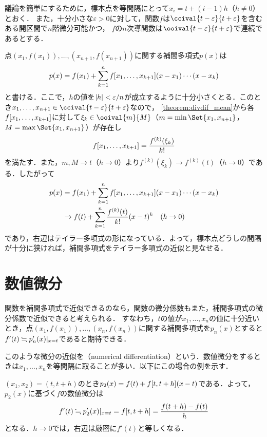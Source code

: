 \documentclass[../../main]{subfiles}
\begin{document}
議論を簡単にするために，標本点を等間隔にとって\(x_i=t+(i-1)h\)（\(h\neq 0\)）とおく．
また，十分小さな\(\varepsilon>0\)に対して，関数\(f\)は\(\ccival{t-\varepsilon}{t+\varepsilon}\)を含むある開区間で\(n\)階微分可能かつ，
\(f\)の\(n\)次導関数は\(\ooival{t-\varepsilon}{t+\varepsilon}\)で連続であるとする．

点\((x_1,f(x_1)),\dots,(x_{n+1},f(x_{n+1}))\)に関する補間多項式\(p(x)\)は
\[
  p(x) = f(x_1)+\sum_{k=1}^n\divdiff[f]{x_1,\dots,x_{k+1}}(x-x_1)\dotsm(x-x_k)
\]
と書ける．ここで，\(h\)の値を\(\abs{h}<\varepsilon/n\)が成立するように十分小さくとる．このとき\(x_1,\dots,x_{n+1}\in\ccival{t-\varepsilon}{t+\varepsilon}\)なので，
\cref{theorem:divdif_mean}から各\(\divdiff[f]{x_1,\dots,x_{k+1}}\)に対して\(\xi_k\in\ooival{m}{M}\)（\(m=\min\Set{x_1,x_{n+1}}\)，\(M=\max\Set{x_1,x_{n+1}}\)）が存在し
\[
  \divdiff[f]{x_1,\dots,x_{k+1}} = \frac{f^{(k)}(\xi_k)}{k!}
\]
を満たす．また，\(m,M\to t\)（\(h\to 0\)）より\(f^{(k)}(\xi_k)\to f^{(k)}(t)\)（\(h\to 0\)）である．したがって
\begin{align*}
  p(x) &=f(x_1)+\sum_{k=1}^n\divdiff[f]{x_1,\dots,x_{k+1}}(x-x_1)\dotsm (x-x_k) \\
  &\to f(t)+\sum_{k=1}^n\frac{f^{(k)}(t)}{k!}(x-t)^k\quad(h\to 0)
\end{align*}
であり，右辺はテイラー多項式の形になっている．よって，標本点どうしの間隔が十分に狭ければ，補間多項式をテイラー多項式の近似と見なせる．

\section{数値微分}
関数を補間多項式で近似できるのなら，関数の微分係数もまた，補間多項式の微分係数で近似できると考えられる．
すなわち，\(t\)の値が\(x_1,\dots,x_n\)の値に十分近いとき，点\((x_1,f(x_1)),\dots,(x_n,f(x_n))\)に関する補間多項式を\(p_n(x)\)とすると\(f'(t)\fallingdotseq\eval{p_n'(x)}_{x=t}\)であると期待できる．

このような微分の近似を（numerical differentiation）という．数値微分をするときは\(x_1,\dots,x_n\)を等間隔に取ることが多い．以下にこの場合の例を示す．

\begin{example}
\label{example:numerical_differentiation_1}
\((x_1,x_2)=(t,t+h)\)のとき\(p_2(x)=f(t)+\divdiff[f]{t,t+h}(x-t)\)である．よって，\(p_2(x)\)に基づく\(f\)の数値微分は
\[
  f'(t) \fallingdotseq \eval{p_2'(x)}_{x=t}
  = \divdiff[f]{t,t+h}
  = \frac{f(t+h)-f(t)}{h}
\]
となる．\(h\to 0\)では，右辺は厳密に\(f'(t)\)と等しくなる．
\end{example}
\end{document}
